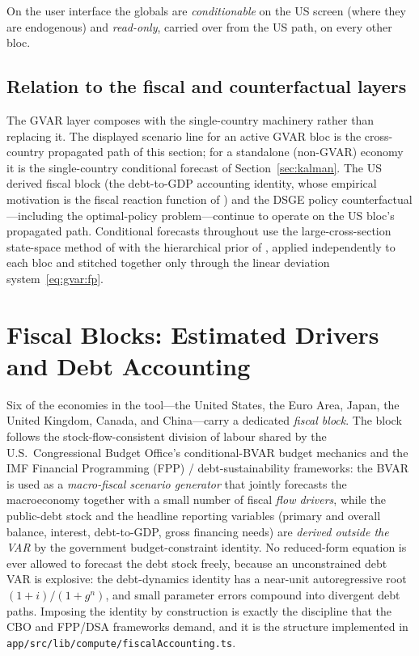 \documentclass[11pt]{article}
\theoremstyle{definition}
\theoremstyle{remark}
\begin{document}
On the user interface the globals are \emph{conditionable} on the US screen
(where they are endogenous) and \emph{read-only}, carried over from the US path,
on every other bloc.

\subsection{Relation to the fiscal and counterfactual layers}\label{sec:gvar:layers}

The GVAR layer composes with the single-country machinery rather than replacing
it. The displayed scenario line for an active GVAR bloc is the cross-country
propagated path of this section; for a standalone (non-GVAR) economy it is the
single-country conditional forecast of Section~\ref{sec:kalman}. The US derived
fiscal block (the debt-to-GDP accounting identity, whose empirical motivation is
the fiscal reaction function of \citealp{Bohn1998}) and the DSGE policy
counterfactual---including the \citet{BarnichonMesters2023} optimal-policy
problem---continue to operate on the US bloc's propagated path. Conditional
forecasts throughout use the large-cross-section state-space method of
\citet{BanburaGiannoneLenza2015} with the hierarchical prior of
\citet{Giannone2015}, applied independently to each bloc and stitched together
only through the linear deviation system~\eqref{eq:gvar:fp}.

\section{Fiscal Blocks: Estimated Drivers and Debt Accounting}\label{sec:fiscal}

Six of the economies in the tool---the United States, the Euro Area,
Japan, the United Kingdom, Canada, and China---carry a dedicated
\emph{fiscal block}.  The block follows the stock-flow-consistent
division of labour shared by the U.S.\ Congressional Budget Office's
conditional-BVAR budget mechanics and the IMF Financial Programming
(FPP) / debt-sustainability frameworks: the BVAR is used as a
\emph{macro-fiscal scenario generator} that jointly forecasts the
macroeconomy together with a small number of fiscal \emph{flow drivers},
while the public-debt stock and the headline reporting variables
(primary and overall balance, interest, debt-to-GDP, gross financing
needs) are \emph{derived outside the VAR} by the government
budget-constraint identity.  No reduced-form equation is ever allowed to
forecast the debt stock freely, because an unconstrained debt VAR is
explosive: the debt-dynamics identity has a near-unit autoregressive
root $(1+i)/(1+g^{n})$, and small parameter errors compound into
divergent debt paths.  Imposing the identity by construction is exactly
the discipline that the CBO and FPP/DSA frameworks demand, and it is the
structure implemented in
\texttt{app/src/lib/compute/fiscalAccounting.ts}.
\end{document}
